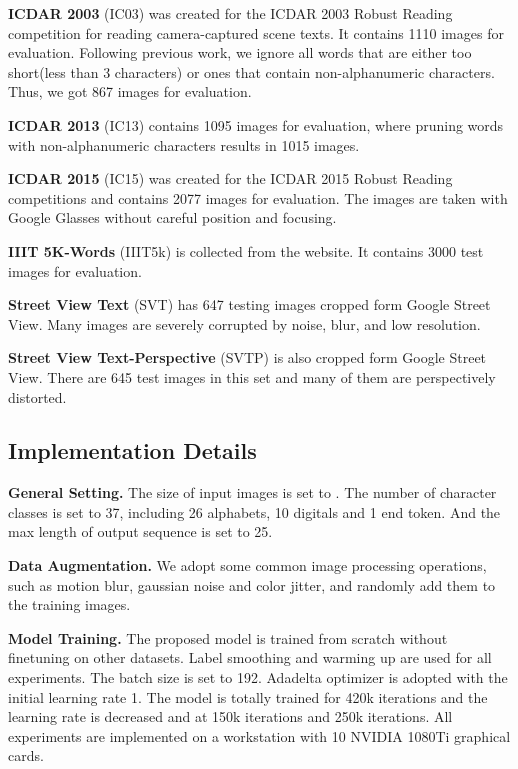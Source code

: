 \documentclass[final]{cvpr}
\begin{document}
\textbf{ICDAR 2003} (IC03) \cite{lucas2005icdar} was created for the ICDAR 2003 Robust Reading competition for reading camera-captured scene texts. It contains 1110 images for evaluation. Following previous work\cite{baek2019wrong, lee2020recognizing}, we ignore all words that are either too short(less than 3 characters) or ones that contain non-alphanumeric characters. Thus, we got 867 images for evaluation.

\textbf{ICDAR 2013} (IC13) \cite{karatzas2013icdar} contains 1095 images for evaluation, where pruning words with non-alphanumeric characters results in 1015 images.

\textbf{ICDAR 2015} (IC15) \cite{karatzas2015icdar} was created for the ICDAR 2015 Robust Reading competitions and contains 2077 images for evaluation. The images are taken with Google Glasses without careful position and focusing.

\textbf{IIIT 5K-Words} (IIIT5k) \cite{mishra2012scene} is collected from the website. It contains 3000 test images for evaluation.

\textbf{Street View Text} (SVT) \cite{wang2011end} has 647 testing images cropped form Google Street View. Many images are severely corrupted by noise, blur, and low resolution.

\textbf{Street View Text-Perspective }(SVTP) \cite{phan2013recognizing} is also cropped form Google Street View. There are 645 test images in this set and many of them are perspectively distorted.

\subsection{Implementation Details}
\label{section.implementation_details}

\textbf{General Setting.}
The size of input images is set to . The number of character classes is set to 37, including 26 alphabets, 10 digitals and 1 end token. And the max length of output sequence  is set to 25.

\textbf{Data Augmentation.}
We adopt some common image processing operations, such as motion blur, gaussian noise and color jitter, and randomly add them to the training images.

\textbf{Model Training.}
The proposed model is trained from scratch without finetuning on other datasets. Label smoothing and warming up are used for all experiments. The batch size is set to 192. Adadelta optimizer is adopted with the initial learning rate 1. The model is totally trained for 420k iterations and the learning rate is decreased  and  at 150k iterations and 250k iterations. All experiments are implemented on a workstation with 10 NVIDIA 1080Ti graphical cards.
\end{document}
